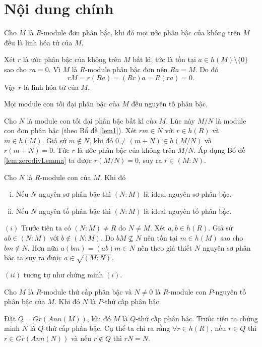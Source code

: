 \section{Nội dung chính}
\begin{lemma}
    \label{lem:zerodivLemma}
    Cho $M$ là $R$-module đơn phân bậc, khi đó mọi ước phân bậc của không trên $M$ đều là linh hóa tử của $M$.
\end{lemma}
\startproof Xét $r$ là ước phân bậc của không trên $M$ bất kì, tức là tồn tại $a \in h(M)\setminus\{0\}$ sao cho $ra=0$. Vì $M$ là $R$-module phân bậc đơn nên $Ra = M$. Do đó
$$
    rM = r(Ra) = (Rr)a = R(ra) = 0.
$$
Vậy $r$ là linh hóa tử của $M$.\QED

\begin{proposition}
    Mọi module con tối đại phân bậc của $M$ đều nguyên tố phân bậc.
\end{proposition}
\startproof Cho $N$ là module con tối đại phân bậc bất kì của $M$. Lúc này $M/N$ là module con đơn phân bậc (theo Bổ đề \ref{lem1}). Xét $rm \in N$ với $r \in h(R)$ và $m \in h(M)$. Giả sử $m \notin N$, khi đó $0 \neq (m + N) \in h(M/N)$ và $r(m+N) = 0$. Tức $r$ là ước phân bậc của không trên $M/N$. Áp dụng Bổ đề \ref{lem:zerodivLemma} ta được $r(M/N) = 0$, suy ra $r \in (M:N)$. \QED

\begin{proposition}
    Cho $N$ là $R$-module con của $M$. Khi đó
    \begin{enumerate}[(i)]
        \item Nếu $N$ nguyên sơ phân bậc thì $(N:M)$ là ideal nguyên sơ phân bậc.
        \item Nếu $N$ nguyên tố phân bậc thì $(N:M)$ là ideal nguyên tố phân bậc.
    \end{enumerate}
\end{proposition}
\startproof $(i)$ Trước tiên ta có $(N:M) \neq R$ do $N \neq M$. Xét $a,b \in h(R)$. Giả sử $ab \in (N:M)$ với $b \notin (N:M)$. Do $bM \not\subseteq N$ nên tồn tại $m \in h(M)$ sao cho $bm \notin N$. Hơn nữa $a(bm) = (ab)m \in N$ nên theo giả thiết $N$ nguyên sơ phân bậc ta suy ra được $a \in \sqrt{(M:N)}$.\QED

\noindent
$(ii)$ tương tự như chứng minh $(i)$.

\begin{theorem}
    Cho $M$ là $R$-module thứ cấp phân bậc và $N \neq 0$ là $R$-module con $P$-nguyên tố phân bậc của $M$. Khi đó $N$ là $P$-thứ cấp phân bậc.
\end{theorem}
\startproof Đặt $Q = Gr(Ann(M))$, khi đó $M$ là $Q$-thứ cấp phân bậc. Trước tiên ta chứng minh $N$ là $Q$-thứ cấp phân bậc. Cụ thể ta chỉ ra rằng $\forall r \in h(R)$, nếu $r \in Q$ thì $r \in Gr(Ann(N))$ và nếu $r \notin Q$ thì $rN = N$.

